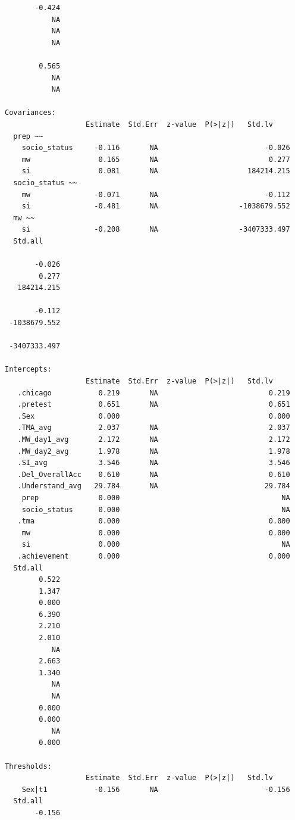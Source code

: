 \documentclass[
  letterpaper,
  DIV=11,
  numbers=noendperiod]{scrartcl}
\begin{document}
\begin{verbatim}
       -0.424
           NA
           NA
           NA
             
        0.565
           NA
           NA

Covariances:
                   Estimate  Std.Err  z-value  P(>|z|)   Std.lv    
  prep ~~                                                          
    socio_status     -0.116       NA                         -0.026
    mw                0.165       NA                          0.277
    si                0.081       NA                     184214.215
  socio_status ~~                                                  
    mw               -0.071       NA                         -0.112
    si               -0.481       NA                   -1038679.552
  mw ~~                                                            
    si               -0.208       NA                   -3407333.497
  Std.all    
             
       -0.026
        0.277
   184214.215
             
       -0.112
 -1038679.552
             
 -3407333.497

Intercepts:
                   Estimate  Std.Err  z-value  P(>|z|)   Std.lv    
   .chicago           0.219       NA                          0.219
   .pretest           0.651       NA                          0.651
   .Sex               0.000                                   0.000
   .TMA_avg           2.037       NA                          2.037
   .MW_day1_avg       2.172       NA                          2.172
   .MW_day2_avg       1.978       NA                          1.978
   .SI_avg            3.546       NA                          3.546
   .Del_OverallAcc    0.610       NA                          0.610
   .Understand_avg   29.784       NA                         29.784
    prep              0.000                                      NA
    socio_status      0.000                                      NA
   .tma               0.000                                   0.000
    mw                0.000                                   0.000
    si                0.000                                      NA
   .achievement       0.000                                   0.000
  Std.all    
        0.522
        1.347
        0.000
        6.390
        2.210
        2.010
           NA
        2.663
        1.340
           NA
           NA
        0.000
        0.000
           NA
        0.000

Thresholds:
                   Estimate  Std.Err  z-value  P(>|z|)   Std.lv    
    Sex|t1           -0.156       NA                         -0.156
  Std.all    
       -0.156


\end{verbatim}
\end{document}
